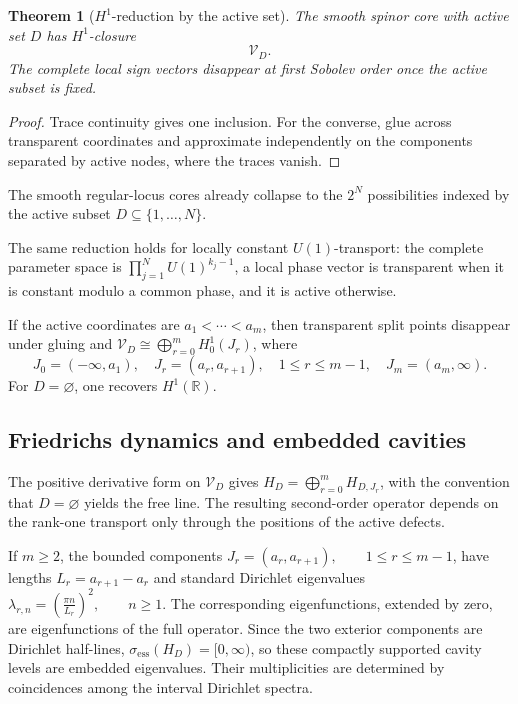 \documentclass[11pt]{article}
\theoremstyle{plain}
\newtheorem{theorem}{Theorem}[section]
\theoremstyle{definition}
\begin{document}
\begin{theorem}[\(H^1\)-reduction by the active set]
\label{thm:multisplit-H1-closure}
The smooth spinor core with active set \(D\) has \(H^1\)-closure
\[
  \mathcal V_D.
\]
The complete local sign vectors disappear at first Sobolev
order once the active subset is fixed.
\end{theorem}

\begin{proof}
Trace continuity gives one inclusion. For the converse, glue across
transparent coordinates and approximate independently on the components
separated by active nodes, where the traces vanish.
\end{proof}

The smooth regular-locus cores already collapse to the
\(2^N\) possibilities indexed by the active subset
\(D\subseteq\{1,\ldots,N\}\).

The same reduction holds for locally constant \(U(1)\)-transport: the
complete parameter space is
\(\prod_{j=1}^{N}U(1)^{k_j-1}\),
a local phase vector is transparent when it is constant modulo a common
phase, and it is active otherwise.

If the active coordinates are
\(a_1<\cdots<a_m\),
then transparent split points disappear under gluing and
\(\mathcal V_D \cong \bigoplus_{r=0}^{m}H^1_0(J_r)\),
where
\[
  J_0=(-\infty,a_1),
  \quad
  J_r=(a_r,a_{r+1}),
  \quad
  1\leq r\leq m-1,
  \quad
  J_m=(a_m,\infty).
\]
For \(D=\varnothing\), one recovers \(H^1(\mathbb R)\).

\subsection{Friedrichs dynamics and embedded cavities}
\label{subsec:multisplit-Friedrichs}
\label{subsec:multisplit-cavities}

The positive derivative form on \(\mathcal V_D\) gives
\(H_D = \bigoplus_{r=0}^{m} H_{D,J_r}\),
with the convention that \(D=\varnothing\) yields the free line. The
resulting second-order operator depends on the rank-one transport only
through the positions of the active defects.

If \(m\geq2\), the bounded components
\(J_r=(a_r,a_{r+1}), \qquad 1\leq r\leq m-1\),
have lengths \(L_r=a_{r+1}-a_r\) and standard Dirichlet eigenvalues
\(\lambda_{r,n} = \left( \frac{\pi n}{L_r} \right)^2, \qquad n\geq1\).
The corresponding eigenfunctions, extended by zero, are eigenfunctions of
the full operator. Since the two exterior components are Dirichlet
half-lines,
\(\sigma_{\mathrm{ess}}(H_D)=[0,\infty)\),
so these compactly supported cavity levels are embedded eigenvalues. Their
multiplicities are determined by coincidences among the interval Dirichlet
spectra.
\end{document}
